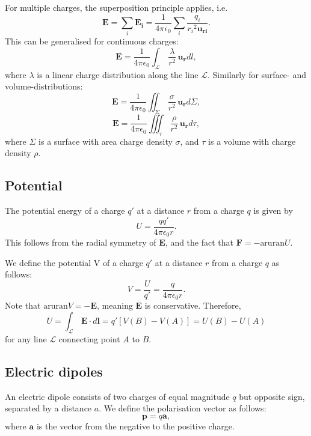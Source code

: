 \documentclass[a4paper, 12pt]{article}
\renewcommand{\vec}[1]{\mathbf{#1}}
\newcommand{\E}{\ensuremath{\vec{E}}}
\newcommand{\e}{\ensuremath{\epsilon_0}}
\renewcommand{\nabla}{\text{aruran}}
\begin{document}
    For multiple charges, the superposition principle applies, i.e. 
    \begin{equation}
        \E = \sum_i\vec{E_i} = \frac{1}{4\pi\e}\sum_i\frac{q_i}{{r_i}^2\vec{u_{ri}}}.
    \end{equation}
    This can be generalised for continuous charges: 
    \begin{equation}
        \E = \frac{1}{4\pi\e}\int_\mathcal{L}\,\frac{\lambda}{r^2}\,\vec{u_r}dl,
    \end{equation}
    where $\lambda$ is a linear charge distribution along the line $\mathcal{L}$. Similarly for surface- and volume-distributions: 
    \begin{equation}
        \E = \frac{1}{4\pi\e}\iint_\Sigma\,\frac{\sigma}{r^2}\,\vec{u_r}d\Sigma,
    \end{equation}
    \begin{equation}
        \E = \frac{1}{4\pi\e}\iiint_{\tau}\,\frac{\rho}{r^2}\,\vec{u_r}d\tau,
    \end{equation}
    where $\Sigma$ is a surface with area charge density $\sigma$, and $\tau$ is a volume with charge density $\rho$.
    
\subsection{Potential}
    The potential energy of a charge $q'$ at a distance $r$ from a charge $q$ is given by
    \begin{equation}
        U = \frac{qq'}{4\pi\e r}.
    \end{equation}
    This follows from the radial symmetry of \E, and the fact that $\vec{F} = - \nabla U$.
    
    
    We define the potential V of a charge $q'$ at a distance $r$ from a charge $q$ as follows: 
    \begin{equation}
        V = \frac{U}{q'} = \frac{q}{4\pi\e r}.
    \end{equation}
    Note that $\nabla V = -\E$, meaning $\E$ is conservative. Therefore, 
    \begin{equation}
        U = \int_\mathcal{L}\,\E\cdot d\vec{l} = q'[V(B) - V(A)] = U(B) - U(A)
    \end{equation}
    for any line $\mathcal{L}$ connecting point $A$ to $B$.
\subsection{Electric dipoles}
    An electric dipole consists of two charges of equal magnitude $q$ but opposite sign, separated by a distance $a$. We define the polarisation vector as follows: 
    \begin{equation}
        \vec{p} = q\vec{a},
    \end{equation}
    where $\vec{a}$ is the vector from the negative  to the positive charge. 
    
\end{document}
